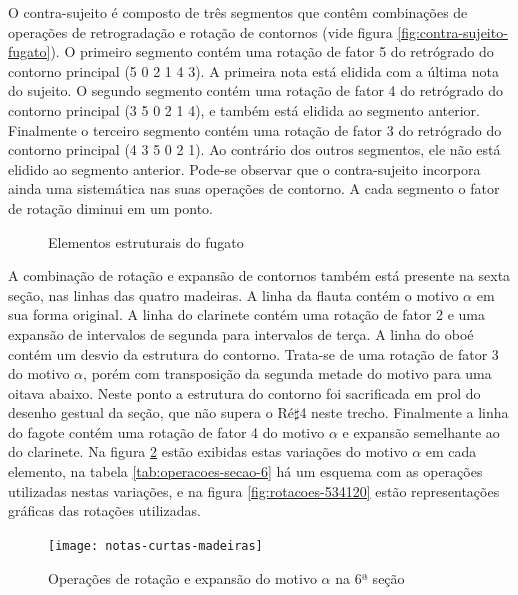 O contra-sujeito é composto de três segmentos que contêm combinações
de operações de retrogradação e rotação de contornos (vide figura
\ref{fig:contra-sujeito-fugato}). O primeiro segmento contém uma
rotação de fator 5 do retrógrado do contorno principal (5 0 2 1 4
3). A primeira nota está elidida com a última nota do sujeito. O
segundo segmento contém uma rotação de fator 4 do retrógrado do
contorno principal (3 5 0 2 1 4), e também está elidida ao segmento
anterior. Finalmente o terceiro segmento contém uma rotação de fator 3
do retrógrado do contorno principal (4 3 5 0 2 1). Ao contrário dos
outros segmentos, ele não está elidido ao segmento anterior. Pode-se
observar que o contra-sujeito incorpora ainda uma sistemática nas suas
operações de contorno. A cada segmento o fator de rotação diminui em
um ponto.

\begin{figure}
  \centering

  \caption{Elementos estruturais do fugato}
  \label{fig:elementos-fugato}
\end{figure}

A combinação de rotação e expansão de contornos também está presente
na sexta seção, nas linhas das quatro madeiras. A linha da flauta
contém o motivo $\alpha$ em sua forma original. A linha do clarinete
contém uma rotação de fator 2 e uma expansão de intervalos de segunda
para intervalos de terça. A linha do oboé contém um desvio da
estrutura do contorno. Trata-se de uma rotação de fator 3 do motivo
$\alpha$, porém com transposição da segunda metade do motivo para uma
oitava abaixo. Neste ponto a estrutura do contorno foi sacrificada em
prol do desenho gestual da seção, que não supera o Ré$\sharp$4 neste
trecho. Finalmente a linha do fagote contém uma rotação de fator 4 do
motivo $\alpha$ e expansão semelhante ao do clarinete. Na figura
\ref{fig:notas-curtas-madeiras} estão exibidas estas variações do
motivo $\alpha$ em cada elemento, na tabela
\ref{tab:operacoes-secao-6} há um esquema com as operações utilizadas
nestas variações, e na figura \ref{fig:rotacoes-534120} estão
representações gráficas das rotações utilizadas.

\begin{figure}
  \centering
    \texttt{[image: notas-curtas-madeiras]}
    \caption{Operações de rotação e expansão do motivo $\alpha$ na 6ª
    seção}
  \label{fig:notas-curtas-madeiras}
\end{figure}

